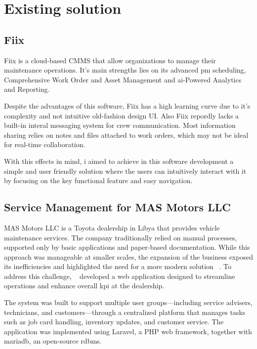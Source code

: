 \section{Existing solution}

\subsection{Fiix}
Fiix is a cloud-based \ac{CMMS} that allow organizations to manage their maintenance operations. 
It's main strengths lies on its advanced \acs{pm} scheduling, Comprehensive Work Order and Asset Management and \ac{ai}-Powered Analytics and Reporting. \cite{Doan_2025, Rockwell_Automation_2022}

Despite the advantages of this software, Fiix has a high learning curve due to it's complexity and not intuitive old-fashion design \ac{UI}. 
Also Fiix repordly lacks a built-in interal messaging system for crew communication.  Most information sharing relies on notes and files attached to work orders, which may not be ideal for real-time collaboration. \cite{Doan_2025}

With this effects in mind, i aimed to achieve in this software development a simple and user friendly solution where the users can intuitively interact with it by focusing on the key functional feature and easy navigation.

\subsection{Service Management for MAS Motors LLC}
MAS Motors LLC is a Toyota dealership in Libya that provides vehicle maintenance services. The company traditionally relied on manual processes, supported only by basic applications and paper-based documentation. While this approach was manageable at smaller scales, the expansion of the business exposed its inefficiencies and highlighted the need for a more modern solution ~\cite{MAS_MOTORS}. To address this challenge, ~\citet{MAS_MOTORS} developed a web application designed to streamline operations and enhance overall \acs{kpi} at the dealership.

The system was built to support multiple user groups—including service advisers, technicians, and customers—through a centralized platform that manages tasks such as job card handling, inventory updates, and customer service. The application was implemented using Laravel, a \ac{PHP} web framework, together with \ac{mariadb}, an open-source \ac{rdbms}.

